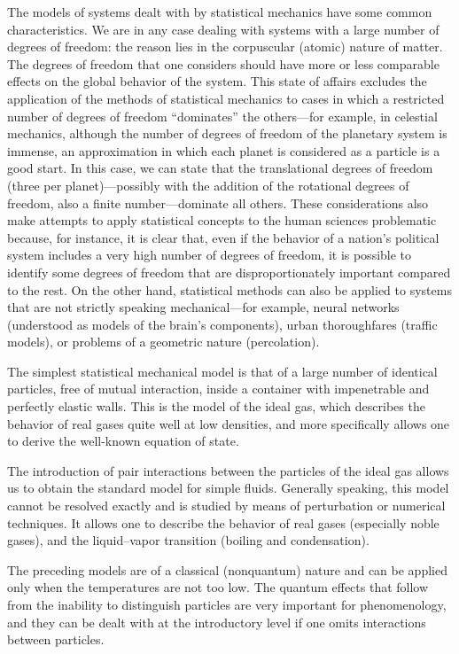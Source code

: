 \documentclass[11pt, a4paper, twoside, openright]{book}
\begin{document}
The models of systems dealt with by statistical mechanics have some common characteristics. We are in any case dealing with systems with a large number of degrees of freedom:  the reason lies in the corpuscular (atomic) nature of matter.
 The degrees of freedom that one considers should have more or less comparable effects on the global behavior of the system.  This state of affairs excludes the application of the methods of statistical mechanics to cases in which a restricted number of degrees of freedom “dominates” the others—for example, in celestial mechanics, although the number of degrees of freedom of the planetary system is immense, an approximation in which each planet is considered as a particle is a good start. In this case, we can state that the translational degrees of freedom (three per planet)—possibly with the addition of the rotational degrees of freedom, also a finite number—dominate all others.
 These considerations also make attempts to apply statistical concepts to the human sciences problematic because, for instance, it is clear that, even if the behavior of a nation’s political system includes a very high number of degrees of freedom, it is possible to identify some degrees of freedom that are disproportionately important compared to the rest.
  On the other hand, statistical methods can also be applied to systems that are not strictly speaking mechanical—for example, neural networks (understood as models of the brain’s components), urban thoroughfares (traffic models), or problems of a geometric nature (percolation).
 
 The simplest statistical mechanical model is that of a large number of identical particles, free of mutual interaction, inside a container with impenetrable and perfectly elastic walls. This is the model of the ideal gas, which describes the behavior of real gases quite well at low densities, and more specifically allows one to derive the well-known equation of state.

The introduction of pair interactions between the particles of the ideal gas allows us to obtain the standard model for simple fluids. Generally speaking, this model cannot be resolved exactly and is studied by means of perturbation or numerical techniques. It allows one to describe the behavior of real gases (especially noble gases), and the liquid–vapor transition (boiling and condensation).

The preceding models are of a classical (nonquantum) nature and can be applied only when the temperatures are not too low. The quantum effects that follow from the inability to distinguish particles are very important for phenomenology, and they can be dealt with at the introductory level if one omits interactions between particles. 
\end{document}
